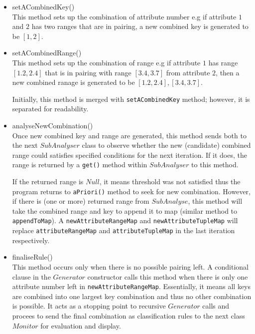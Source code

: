 \begin{description}
\begin{itemize}
	\item{setACombinedKey()} \\
	This method sets up the combination of attribute number e.g if attribute $1$ and $2$ has two ranges that are in pairing, a new combined key is generated to be $[1, 2]$.
	
	\item{setACombinedRange()} \\
	This method sets up the combination of range e.g if attribute $1$ has range $[1.2, 2.4]$ that is in pairing with range $[3.4,3.7]$ from attribute $2$, then a new combined ranage is generated to be ${[1.2, 2.4], [3.4, 3.7]}$.
	
	Initially, this method is merged with \texttt{setACombinedKey} method; however, it is separated for readability.
	
	\item{analyseNewCombination()} \\
	 Once new combined key and range are generated, this method sends both to the next $SubAnalyser$ class to observe whether the new (candidate) combined range could satisfies specified conditions for the next iteration. If it does, the range is returned by a \texttt{get()} method within $SubAnalyser$ to this method. 
	 
	 If the returned range is $Null$, it means threshold was not satisfied thus the program returns to \texttt{aPriori()} method to seek for new combination. However, if there is (one or more) returned range from $SubAnalyse$, this method will take the combined range and key to append it to map (similar method to \texttt{appendToMap}). A \texttt{newAttributeRangeMap} and \texttt{newAttributeTupleMap} will replace \texttt{attributeRangeMap} and \texttt{attributeTupleMap} in the last iteration respectively.
	
	\item{finaliseRule()} \\
	This method occurs only when there is no possible pairing left. A conditional clause in the $Generator$ constructor calls this method when there is only one attribute number left in \texttt{newAttributeRangeMap}. Essentially, it means all keys are combined into one largest key combination and thus no other combination is possible. It acts as a stopping point to recursive $Generator$ calls and procees to send the final combination as classification rules to the next class $Monitor$ for evaluation and display.
	
\end{itemize}


\end{description}
